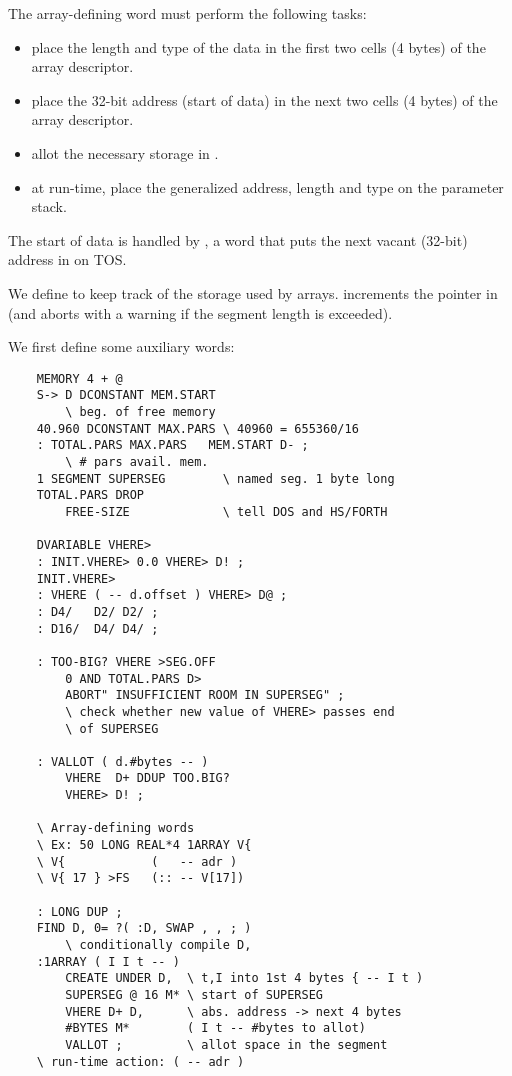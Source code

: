 The array-defining word  must perform the following
tasks:

\begin{itemize}
    \item place the length and type of the data in the first two cells (4 bytes) of the array descriptor.
    \item place the 32-bit address (start of data) in the next two cells (4 bytes) of the array descriptor.
    \item allot the necessary storage in .
    \item at run-time, place the generalized address, length and type on the parameter stack.
\end{itemize}

The start of data is handled by , a word that puts the next vacant (32-bit) address in  on TOS.

We define  to keep track of the storage used by arrays.  increments the pointer in  (and aborts with a warning if the segment length is exceeded).

We first define some auxiliary words:
\begin{lstlisting}
    MEMORY 4 + @
    S-> D DCONSTANT MEM.START
        \ beg. of free memory
    40.960 DCONSTANT MAX.PARS \ 40960 = 655360/16
    : TOTAL.PARS MAX.PARS   MEM.START D- ;
        \ # pars avail. mem.
    1 SEGMENT SUPERSEG        \ named seg. 1 byte long
    TOTAL.PARS DROP
        FREE-SIZE             \ tell DOS and HS/FORTH

    DVARIABLE VHERE>
    : INIT.VHERE> 0.0 VHERE> D! ;
    INIT.VHERE>
    : VHERE ( -- d.offset ) VHERE> D@ ;
    : D4/   D2/ D2/ ;
    : D16/  D4/ D4/ ;

    : TOO-BIG? VHERE >SEG.OFF
        0 AND TOTAL.PARS D>
        ABORT" INSUFFICIENT ROOM IN SUPERSEG" ;
        \ check whether new value of VHERE> passes end
        \ of SUPERSEG

    : VALLOT ( d.#bytes -- )
        VHERE  D+ DDUP TOO.BIG?
        VHERE> D! ;

    \ Array-defining words
    \ Ex: 50 LONG REAL*4 1ARRAY V{
    \ V{            (   -- adr )
    \ V{ 17 } >FS   (:: -- V[17])

    : LONG DUP ;
    FIND D, 0= ?( :D, SWAP , , ; )
        \ conditionally compile D,
    :1ARRAY ( I I t -- )
        CREATE UNDER D,  \ t,I into 1st 4 bytes { -- I t )
        SUPERSEG @ 16 M* \ start of SUPERSEG
        VHERE D+ D,      \ abs. address -> next 4 bytes
        #BYTES M*        ( I t -- #bytes to allot)
        VALLOT ;         \ allot space in the segment
    \ run-time action: ( -- adr )
\end{lstlisting}

